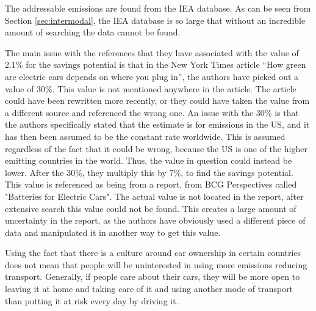 The addressable emissions are found from the IEA database. As can be seen from Section \ref{sec:intermodal}, the IEA database is so large that without an incredible amount of searching the data cannot be found.

The main issue with the references that they have associated with the value of 2.1\% for the savings potential is that in the New York Times article “How green are electric cars depends on where you plug in”, the authors have picked out a value of 30\%. This value is not mentioned anywhere in the article. The article could have been rewritten more recently, or they could have taken the value from a different source and referenced the wrong one. An issue with the 30\% is that the authors specifically stated that the estimate is for emissions in the US, and it has then been assumed to be the constant rate worldwide. This is assumed regardless of the fact that it could be wrong, because the US is one of the higher emitting countries in the world. Thus, the value in question could instead be lower. 
After the 30\%, they multiply this by 7\%, to find the savings potential. This value is referenced as being from a report, from BCG Perspectives called "Batteries for Electric Cars". The actual value is not located in the report, after extensive search this value could not be found. This creates a large amount of uncertainty in the report, as the authors have obviously used a different piece of data and manipulated it in another way to get this value. 


Using the fact that there is a culture around car ownership in certain countries does not mean that people will be uninterested in using more emissions reducing transport. Generally, if people care about their cars, they will be more open to leaving it at home and taking care of it and using another mode of transport than putting it at risk every day by driving it.




